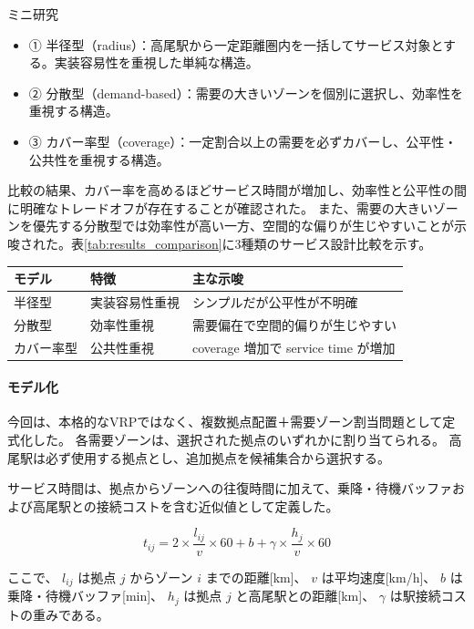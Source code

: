 \begin{column}{ミニ研究}
\begin{itemize}
  \item ① 半径型（radius）：高尾駅から一定距離圏内を一括してサービス対象とする。実装容易性を重視した単純な構造。
  \item ② 分散型（demand-based）：需要の大きいゾーンを個別に選択し、効率性を重視する構造。
  \item ③ カバー率型（coverage）：一定割合以上の需要を必ずカバーし、公平性・公共性を重視する構造。
\end{itemize}

比較の結果、カバー率を高めるほどサービス時間が増加し、効率性と公平性の間に明確なトレードオフが存在することが確認された。
また、需要の大きいゾーンを優先する分散型では効率性が高い一方、空間的な偏りが生じやすいことが示唆された。表\ref{tab:results_comparison}に3種類のサービス設計比較を示す。

 \begin{center}
   \begin{tabular}{lll}
     \toprule
     モデル & 特徴 & 主な示唆 \\
     \midrule
     半径型 & 実装容易性重視 & シンプルだが公平性が不明確 \\
     分散型 & 効率性重視 & 需要偏在で空間的偏りが生じやすい \\
     カバー率型 & 公共性重視 & coverage 増加で service time が増加 \\
     \bottomrule
   \end{tabular}
   \label{tab:results_comparison}
 \end{center}

\paragraph{モデル化}
今回は、本格的なVRPではなく、複数拠点配置＋需要ゾーン割当問題として定式化した。
各需要ゾーンは、選択された拠点のいずれかに割り当てられる。
高尾駅は必ず使用する拠点とし、追加拠点を候補集合から選択する。

サービス時間は、拠点からゾーンへの往復時間に加えて、乗降・待機バッファおよび高尾駅との接続コストを含む近似値として定義した。

\[
t_{ij}
=
2 \times \frac{l_{ij}}{v} \times 60
+
b
+
\gamma \times \frac{h_j}{v} \times 60
\]

ここで、
$l_{ij}$ は拠点 $j$ からゾーン $i$ までの距離[km]、
$v$ は平均速度[km/h]、
$b$ は乗降・待機バッファ[min]、
$h_j$ は拠点 $j$ と高尾駅との距離[km]、
$\gamma$ は駅接続コストの重みである。


\end{column}
